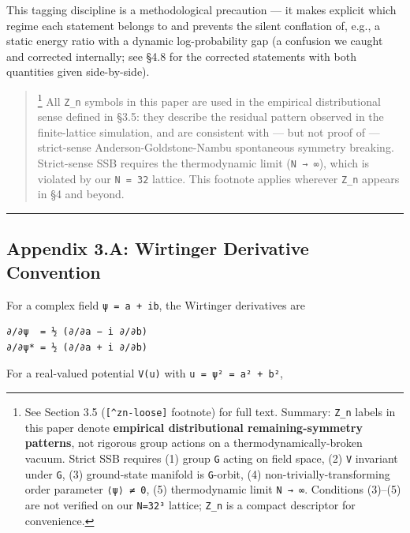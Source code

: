 \documentclass[
]{article}
\begin{document}
This tagging discipline is a methodological precaution --- it makes
explicit which regime each statement belongs to and prevents the silent
conflation of, e.g., a static energy ratio with a dynamic
log-probability gap (a confusion we caught and corrected internally; see
§4.8 for the corrected statements with both quantities given
side-by-side).

\begin{quote}
\footnote{See Section 3.5 (\texttt{{[}\^{}zn-loose{]}} footnote) for
  full text. Summary: \texttt{Z\_n} labels in this paper denote
  \textbf{empirical distributional remaining-symmetry patterns}, not
  rigorous group actions on a thermodynamically-broken vacuum. Strict
  SSB requires (1) group \texttt{G} acting on field space, (2)
  \texttt{V} invariant under \texttt{G}, (3) ground-state manifold is
  \texttt{G}-orbit, (4) non-trivially-transforming order parameter
  \texttt{⟨ψ⟩\ ≠\ 0}, (5) thermodynamic limit \texttt{N\ →\ ∞}.
  Conditions (3)--(5) are not verified on our \texttt{N=32³} lattice;
  \texttt{Z\_n} is a compact descriptor for convenience.} All
\texttt{Z\_n} symbols in this paper are used in the empirical
distributional sense defined in §3.5: they describe the residual pattern
observed in the finite-lattice simulation, and are consistent with ---
but not proof of --- strict-sense Anderson-Goldstone-Nambu spontaneous
symmetry breaking. Strict-sense SSB requires the thermodynamic limit
(\texttt{N\ →\ ∞}), which is violated by our \texttt{N\ =\ 32} lattice.
This footnote applies wherever \texttt{Z\_n} appears in §4 and beyond.
\end{quote}

\begin{center}\rule{0.5\linewidth}{0.5pt}\end{center}

\hypertarget{appendix-3.a-wirtinger-derivative-convention}{%
\subsection{Appendix 3.A: Wirtinger Derivative
Convention}\label{appendix-3.a-wirtinger-derivative-convention}}

For a complex field \texttt{ψ\ =\ a\ +\ ib}, the Wirtinger derivatives
are

\begin{verbatim}
∂/∂ψ  = ½ (∂/∂a − i ∂/∂b)
∂/∂ψ* = ½ (∂/∂a + i ∂/∂b)
\end{verbatim}

For a real-valued potential \texttt{V(u)} with
\texttt{u\ =\ \textbar{}ψ\textbar{}²\ =\ a²\ +\ b²},
\end{document}
